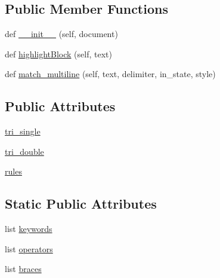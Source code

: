 \subsection*{Public Member Functions}
\begin{DoxyCompactItemize}
\item 
def \mbox{\hyperlink{classgetdist_1_1gui_1_1SyntaxHighlight_1_1PythonHighlighter_a8f23dfebcf3c1d5379921d0595bc3f0a}{\+\_\+\+\_\+init\+\_\+\+\_\+}} (self, document)
\item 
def \mbox{\hyperlink{classgetdist_1_1gui_1_1SyntaxHighlight_1_1PythonHighlighter_af158d6f9127e55af91d7467978feffaf}{highlight\+Block}} (self, text)
\item 
def \mbox{\hyperlink{classgetdist_1_1gui_1_1SyntaxHighlight_1_1PythonHighlighter_a5407f7f702169da64d32c85cd0c25001}{match\+\_\+multiline}} (self, text, delimiter, in\+\_\+state, style)
\end{DoxyCompactItemize}
\subsection*{Public Attributes}
\begin{DoxyCompactItemize}
\item 
\mbox{\hyperlink{classgetdist_1_1gui_1_1SyntaxHighlight_1_1PythonHighlighter_a11be99684ea0153fae32e7df690d1e3f}{tri\+\_\+single}}
\item 
\mbox{\hyperlink{classgetdist_1_1gui_1_1SyntaxHighlight_1_1PythonHighlighter_ae43352b566e021ec4e8354c69aa0ff2f}{tri\+\_\+double}}
\item 
\mbox{\hyperlink{classgetdist_1_1gui_1_1SyntaxHighlight_1_1PythonHighlighter_a52782f6ddd146267ea2e34c73bab6b6e}{rules}}
\end{DoxyCompactItemize}
\subsection*{Static Public Attributes}
\begin{DoxyCompactItemize}
\item 
list \mbox{\hyperlink{classgetdist_1_1gui_1_1SyntaxHighlight_1_1PythonHighlighter_aea268faaa22c37c0ebbdee4c443e7c7e}{keywords}}
\item 
list \mbox{\hyperlink{classgetdist_1_1gui_1_1SyntaxHighlight_1_1PythonHighlighter_aeee70b95cf4392623a0885cda18d941f}{operators}}
\item 
list \mbox{\hyperlink{classgetdist_1_1gui_1_1SyntaxHighlight_1_1PythonHighlighter_a3929e5085d8272b031c3ed6052470bde}{braces}}
\end{DoxyCompactItemize}


